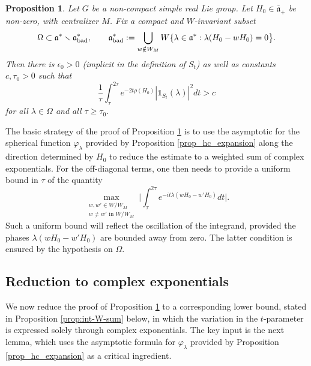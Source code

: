 \documentclass[12pt]{amsart}
\newtheorem{prop}[theorem]{Proposition}
\theoremstyle{remark}
\newcommand{\ga}{\mathfrak a}
\begin{document}
\begin{prop}\label{prop:local-lower-bd}
Let $G$ be a non-compact simple real Lie group. Let $H_0\in\overline{\ga}_+$ be non-zero, with centralizer $M$. Fix a compact and $W$-invariant subset
\begin{equation}\label{eq:Omega-condition}
\Omega\subset\ga^*\smallsetminus \ga^*_{\rm bad},\qquad \ga^*_{\rm bad}:=\bigcup_{w\notin W_M} W\{\lambda\in\ga^*:  \lambda(H_0- wH_0)=0 \big\}.
\end{equation}
Then there is $\epsilon_0>0$ (implicit in the definition of $S_t$) as well as constants $c,\tau_0>0$ such that 
\[
\frac{1}{\tau} \int_{\tau}^{2\tau} e^{-2t \rho(H_0)} |\widehat{\mathds{1}_{S_t}}(\lambda)|^2 dt > c
\]
for all $\lambda\in \Omega$ and all $\tau \geq \tau_0$. 
\end{prop}

The basic strategy of the proof of Proposition \ref{prop:local-lower-bd} is to use the asymptotic for the spherical function $\varphi_\lambda$ provided by Proposition \ref{prop_hc_expansion} along the direction determined by $H_0$ to reduce the estimate to a weighted sum of complex exponentials. For the off-diagonal terms, one then needs to provide a uniform bound in $\tau$ of the quantity
\[
\max_{\substack{w, w' \in W/W_M\\ w\neq w' \textrm{ in }  W/W_M }}\bigg|\int_{\tau}^{2\tau} e^{-it \lambda (wH_0-w'H_0)}  dt\bigg|.
\]
Such a uniform bound will reflect the oscillation of the integrand, provided the phases $\lambda (wH_0-w'H_0)$ are bounded away from zero. The latter condition is ensured by the hypothesis on $\Omega$.

\subsection{Reduction to complex exponentials}
We now reduce the proof of Proposition \ref{prop:local-lower-bd} to a corresponding lower bound, stated in Proposition \ref{prop:int-W-sum} below, in which the variation in the $t$-parameter is expressed solely through complex exponentials. The key input is the next lemma, which uses the asymptotic formula for $\varphi_\lambda$ provided by Proposition \ref{prop_hc_expansion} as a critical ingredient.
\end{document}
